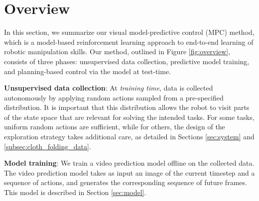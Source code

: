 \section{Overview}\label{sec:prelim}
\label{sec:vmpc}

In this section, we summarize our visual model-predictive control (MPC) method, which is a model-based reinforcement learning approach to end-to-end learning of robotic manipulation skills. Our method, outlined in Figure \ref{fig:overview}, consists of three phases: unsupervised data collection, predictive model training, and planning-based control via the model at test-time.

\noindent \textbf{Unsupervised data collection}: At \emph{training time}, data is collected autonomously by applying random actions sampled from a pre-specified distribution. It is important that this distribution allows the robot to visit parts of the state space that are relevant for solving the intended tasks. For some tasks, uniform random actions are sufficient, while for others, the design of the exploration strategy takes additional care, as detailed in Sections \ref{sec:system} and \ref{subsec:cloth_folding_data}.

\noindent \textbf{Model training}: We train a video prediction model offline on the collected data. The video prediction model takes as input an image of the current timestep and a sequence of actions, and generates the corresponding sequence of future frames. This model is described in Section \ref{sec:model}.

